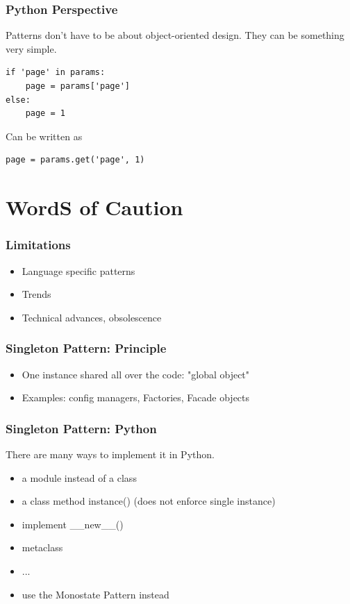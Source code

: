 \documentclass{beamer}
\begin{document}
\begin{frame}[fragile]
\frametitle{Python Perspective}
Patterns don't have to be about object-oriented design. They can be something very simple.
\linebreak
\linebreak
\begin{verbatim}
if 'page' in params:
    page = params['page']
else:
    page = 1
\end{verbatim}
\linebreak
Can be written as
\linebreak
\begin{verbatim}
page = params.get('page', 1)
\end{verbatim}
\end{frame}

\section{WordS of Caution}
\begin{frame}
 \frametitle{Limitations}
\begin{itemize}
 \item Language specific patterns
 \item Trends
 \item Technical advances, obsolescence
\end{itemize}
\end{frame}

\begin{frame}
\frametitle{Singleton Pattern: Principle}
\begin{itemize}
 \item One instance shared all over the code: "global object"
 \item Examples: config managers, Factories, Facade objects
\end{itemize}
\end{frame} 

\begin{frame}
\frametitle{Singleton Pattern: Python}
There are many ways to implement it in Python.
  \begin{itemize}
   \item a module instead of a class
   \item a class method instance() (does not enforce single instance)
   \item implement \_\_new\_\_()
   \item metaclass
   \item ...
   \item use the Monostate Pattern instead
  \end{itemize}
\end{frame}
\end{document}
